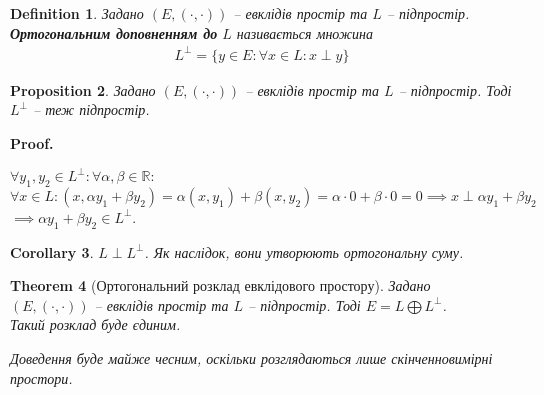 \documentclass[a4paper, 10pt]{article}
\makeatletter
\theoremstyle{theoremdd}
\newtheorem{theorem}{Theorem}[subsection]
\newtheorem{definition}[theorem]{Definition}
\newtheorem{proposition}[theorem]{Proposition}
\newtheorem{corollary}[theorem]{Corollary}
\renewenvironment{proof}[1][Proof.\\]{\par
\pushQED{\hfill \qed}%
\normalfont \topsep6\p@\@plus6\p@\relax
\trivlist
\item\relax
{\bfseries
#1\@addpunct{.}}\hspace\labelsep\ignorespaces
}{%
\popQED\endtrivlist\@endpefalse
}
\makeatother
\begin{document}
\begin{definition}
Задано $(E, (\cdot,\cdot))$ -- евклідів простір та $L$ -- підпростір.\\
\textbf{Ортогональним доповненням до} $L$ називається множина
\begin{align*}
L^{\perp} = \{y \in E: \forall x \in L: x \perp y\}
\end{align*}
\end{definition}

\begin{proposition}
Задано $(E, (\cdot,\cdot))$ -- евклідів простір та $L$ -- підпростір. Тоді $L^{\perp}$ -- теж підпростір.
\end{proposition}

\begin{proof}
$\forall y_1,y_2 \in L^{\perp}: \forall \alpha,\beta \in \mathbb{R}:$\\
$\forall x \in L: (x, \alpha y_1+ \beta y_2) = \alpha (x,y_1) + \beta (x,y_2) = \alpha \cdot 0 + \beta \cdot 0 = 0 \implies x \perp \alpha y_1 + \beta y_2$\\
$\implies \alpha y_1 + \beta y_2 \in L^{\perp}$.
\end{proof}

\begin{corollary}
$L \perp L^\perp$. Як наслідок, вони утворюють ортогональну суму.
\end{corollary}

\begin{theorem}[Ортогональний розклад евклідового простору]
Задано $(E, (\cdot,\cdot))$ -- евклідів простір та $L$ -- підпростір.
Тоді $E = L \bigoplus L^{\perp}$.\\
Такий розклад буде єдиним.
\end{theorem}
\noindent
\textit{Доведення буде майже чесним, оскільки розглядаються лише скінченновимірні простори.}
\end{document}
